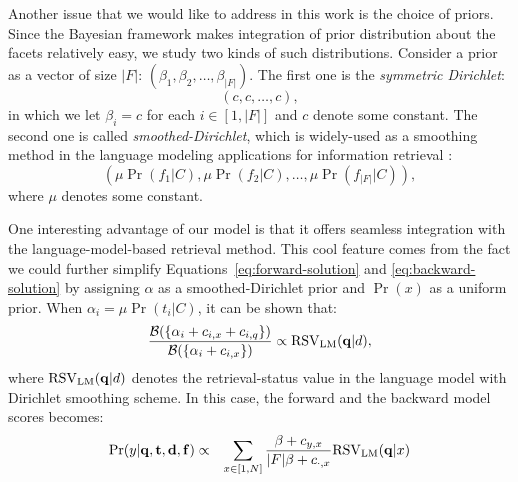 Another issue that we would like to address in this work is the choice of
priors.  Since the Bayesian framework makes integration of prior distribution
about the facets relatively easy, we study two kinds of such distributions.
Consider a prior as a vector of size $|F|$: $(\beta_1, \beta_2, \ldots,
\beta_{|F|})$.  The first one is the \emph{symmetric Dirichlet}: \[ (c, c,
\ldots, c), \] in which we let $\beta_i = c$ for each $i \in [1, |F|]$ and $c$
denote some constant.  The second one is called \emph{smoothed-Dirichlet},
which is widely-used as a smoothing method in the language modeling
applications for information retrieval \cite{zhai2004study}: \[ (\mu
\Pr(f_1|C), \mu \Pr(f_2|C), \ldots, \mu \Pr(f_{|F|}|C)), \] where $\mu$ denotes
some constant.

One interesting advantage of our model is that it offers seamless integration
with the language-model-based retrieval method.  This cool feature comes from
the fact we could further simplify Equations~\eqref{eq:forward-solution} and
\eqref{eq:backward-solution} by assigning $\alpha$ as a smoothed-Dirichlet
prior and $\Pr(x)$ as a uniform prior.  When $\alpha_i = \mu \Pr(t_i|C)$, it
can be shown that: \[ \frac{\mathcal{B}(\{\alpha_i + c_{i,x} + c_{i,q}
\})}{\mathcal{B}(\{\alpha_i + c_{i,x} \})} \propto {\rm RSV}_{\rm
LM}(\mathbf{q}|d), \] where ${\rm RSV}_{\rm LM}(\mathbf{q}|d)$ denotes the
retrieval-status value in the language model with Dirichlet smoothing scheme.
In this case, the forward and the backward model scores becomes:
\begin{eqnarray*}
  \Pr(y|\mathbf{q}, \mathbf{t}, \mathbf{d}, \mathbf{f}) &\propto& 
  \sum_{x \in [1, N]} \frac{\beta + c_{y,x}}{|F|\beta + c_{\cdot,x}}
  {\rm RSV}_{\rm LM}(\mathbf{q}|x) \nonumber\\
\end{eqnarray*} 

